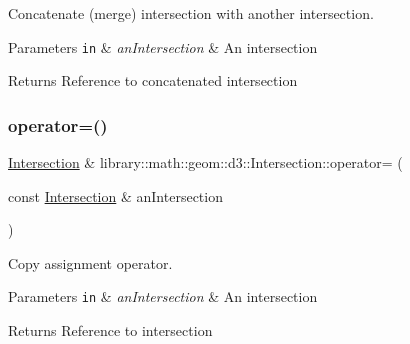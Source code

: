 Concatenate (merge) intersection with another intersection.


\begin{DoxyParams}[1]{Parameters}
\mbox{\tt in}  & {\em an\+Intersection} & An intersection \\
\hline
\end{DoxyParams}
\begin{DoxyReturn}{Returns}
Reference to concatenated intersection 
\end{DoxyReturn}
\mbox{\label{classlibrary_1_1math_1_1geom_1_1d3_1_1_intersection_a41ca5e5ac6fe7bc3f26f516acde56be8}} 
\subsubsection{\texorpdfstring{operator=()}{operator=()}}
{\footnotesize\ttfamily \hyperlink{classlibrary_1_1math_1_1geom_1_1d3_1_1_intersection}{Intersection} \& library\+::math\+::geom\+::d3\+::\+Intersection\+::operator= (\begin{DoxyParamCaption}\item[{const \hyperlink{classlibrary_1_1math_1_1geom_1_1d3_1_1_intersection}{Intersection} \&}]{an\+Intersection }\end{DoxyParamCaption})}



Copy assignment operator. 


\begin{DoxyParams}[1]{Parameters}
\mbox{\tt in}  & {\em an\+Intersection} & An intersection \\
\hline
\end{DoxyParams}
\begin{DoxyReturn}{Returns}
Reference to intersection 
\end{DoxyReturn}
\mbox{\label{classlibrary_1_1math_1_1geom_1_1d3_1_1_intersection_a4205e2dcace3faa8abfeb829423d0baf}} 

